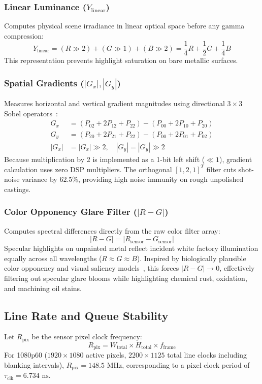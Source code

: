 \documentclass[conference]{IEEEtran}
\begin{document}
\subsubsection{Linear Luminance ($Y_{\text{linear}}$)}
Computes physical scene irradiance in linear optical space before any gamma compression:
\begin{equation}
Y_{\text{linear}} = (R \gg 2) + (G \gg 1) + (B \gg 2) = \frac{1}{4} R + \frac{1}{2} G + \frac{1}{4} B
\end{equation}
This representation prevents highlight saturation on bare metallic surfaces.

\subsubsection{Spatial Gradients ($|G_x|, |G_y|$)}
Measures horizontal and vertical gradient magnitudes using directional $3\times3$ Sobel operators~\cite{sobel1968isotropic}:
\begin{align}
G_x &= (P_{02} + 2P_{12} + P_{22}) - (P_{00} + 2P_{10} + P_{20}) \\
G_y &= (P_{20} + 2P_{21} + P_{22}) - (P_{00} + 2P_{01} + P_{02}) \\
|G_x| &= |G_x| \gg 2, \quad |G_y| = |G_y| \gg 2
\end{align}
Because multiplication by 2 is implemented as a 1-bit left shift ($\ll 1$), gradient calculation uses zero DSP multipliers. The orthogonal $[1, 2, 1]^T$ filter cuts shot-noise variance by $62.5\%$, providing high noise immunity on rough unpolished castings.

\subsubsection{Color Opponency Glare Filter ($|R - G|$)}
Computes spectral differences directly from the raw color filter array:
\begin{equation}
|R - G| = |R_{\text{sensor}} - G_{\text{sensor}}|
\end{equation}
Specular highlights on unpainted metal reflect incident white factory illumination equally across all wavelengths ($R \approx G \approx B$). Inspired by biologically plausible color opponency and visual saliency models~\cite{itti1998model}, this forces $|R - G| \to 0$, effectively filtering out specular glare blooms while highlighting chemical rust, oxidation, and machining oil stains.

\subsection{Line Rate and Queue Stability}
Let $R_{\text{pix}}$ be the sensor pixel clock frequency:
\begin{equation}
R_{\text{pix}} = W_{\text{total}} \times H_{\text{total}} \times f_{\text{frame}}
\end{equation}
For 1080p60 ($1920 \times 1080$ active pixels, $2200 \times 1125$ total line clocks including blanking intervals), $R_{\text{pix}} = 148.5\text{ MHz}$, corresponding to a pixel clock period of $\tau_{\text{clk}} = 6.734\text{ ns}$.
\end{document}
